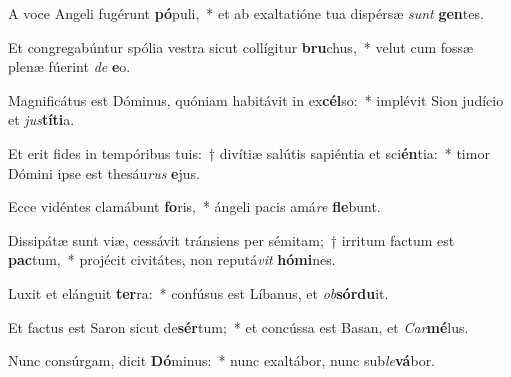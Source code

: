 \item A voce Angeli fugérunt \textbf{pó}puli,~* et ab exaltatióne tua dispérsæ \textit{sunt} \textbf{gen}tes.
\item Et congregabúntur spólia vestra sicut collígitur \textbf{bru}chus,~* velut cum fossæ plenæ fúerint \textit{de} \textbf{e}o.
\item Magnificátus est Dóminus, quóniam habitávit in ex\textbf{cél}so:~* implévit Sion judício et \textit{jus}\textbf{tí}\textbf{ti}a.
\item Et erit fides in tempóribus tuis:~† divítiæ salútis sapiéntia et sci\textbf{én}tia:~* timor Dómini ipse est thesáu\textit{rus} \textbf{e}jus.
\item Ecce vidéntes clamábunt \textbf{fo}ris,~* ángeli pacis amá\textit{re} \textbf{fle}bunt.
\item Dissipátæ sunt viæ, cessávit tránsiens per sémitam;~† irritum factum est \textbf{pac}tum,~* projécit civitátes, non reputá\textit{vit} \textbf{hó}\textbf{mi}nes.
\item Luxit et elánguit \textbf{ter}ra:~* confúsus est Líbanus, et \textit{ob}\textbf{sór}\textbf{du}it.
\item Et factus est Saron sicut de\textbf{sér}tum;~* et concússa est Basan, et \textit{Car}\textbf{mé}lus.
\item Nunc consúrgam, dicit \textbf{Dó}minus:~* nunc exaltábor, nunc sub\textit{le}\textbf{vá}bor.
